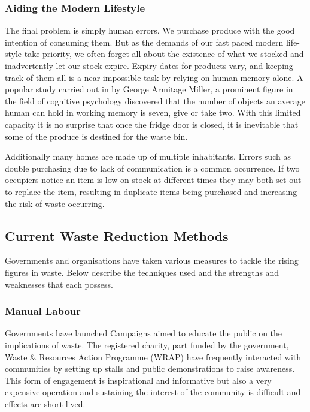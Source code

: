 \documentclass[a4paper, 11pt]{article}
\begin{document}
\subsubsection{Aiding the Modern Lifestyle}
The final problem is simply human errors. We purchase produce with the good intention of consuming them. But as the demands of our fast paced modern life-style take priority, we often forget all about the existence of what we stocked and inadvertently let our stock expire. Expiry dates for products vary, and keeping track of them all is a near impossible task by relying on human memory alone. A popular study carried out in by George Armitage Miller, a prominent figure in the field of cognitive psychology discovered that the number of objects an average human can hold in working memory is seven, give or take two\cite{memory}. With this limited capacity it is no surprise that once the fridge door is closed, it is inevitable that some of the produce is destined for the waste bin.

Additionally many homes are made up of multiple inhabitants. Errors such as double purchasing due to lack of communication is a common occurrence. If two occupiers notice an item is low on stock at different times they may both set out to replace the item, resulting in duplicate items being purchased and increasing the risk of waste occurring. 


\vspace{\baselineskip}
\vspace{\baselineskip}
\subsection{Current Waste Reduction Methods}
Governments and organisations have taken various measures to tackle the rising figures in waste. Below describe the techniques used and the strengths and weaknesses that each possess. 

\subsubsection{Manual Labour} 
Governments have launched Campaigns aimed to educate the public on the implications of waste. The registered charity, part funded by the government, Waste \& Resources Action Programme (WRAP) have frequently interacted with communities by setting up stalls and public demonstrations to raise awareness. This form of engagement is inspirational and informative but also a very expensive operation and sustaining the interest of the community is difficult and effects are short lived.\cite{waste}
\end{document}
